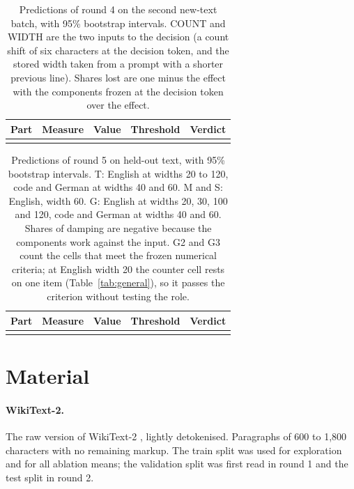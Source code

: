 \documentclass[11pt,a4paper]{article}
\begin{document}
\begin{table}[!tp]
\centering\scriptsize
\caption{Predictions of round 4 on the second new-text batch, with 95\% bootstrap intervals. COUNT and WIDTH are the two inputs to the decision (a count shift of six characters at the decision token, and the stored width taken from a prompt with a shorter previous line). Shares lost are one minus the effect with the components frozen at the decision token over the effect.}
\label{tab:round4}
\begin{tabularx}{\textwidth}{@{}l L P{2.7cm} P{2.9cm} l@{}}
\toprule
Part & Measure & Value & Threshold & Verdict \\
\midrule
{}
\bottomrule
\end{tabularx}
\end{table}

\begin{table}[!tp]
\centering\scriptsize
\caption{Predictions of round 5 on held-out text, with 95\% bootstrap intervals. T: English at widths 20 to 120, code and German at widths 40 and 60. M and S: English, width 60. G: English at widths 20, 30, 100 and 120, code and German at widths 40 and 60. Shares of damping are negative because the components work against the input. G2 and G3 count the cells that meet the frozen numerical criteria; at English width 20 the counter cell rests on one item (Table~\ref{tab:general}), so it passes the criterion without testing the role.}
\label{tab:round5}
\begin{tabularx}{\textwidth}{@{}l L P{3.6cm} P{3.0cm} l@{}}
\toprule
Part & Measure & Value & Threshold & Verdict \\
\midrule
{}
\bottomrule
\end{tabularx}
\end{table}

\FloatBarrier
\section{Material}
\label{app:material}

\paragraph{WikiText-2.}
The raw version of WikiText-2 \citep{merity2017pointer}, lightly detokenised. Paragraphs of 600 to 1,800 characters with no remaining markup. The train split was used for exploration and for all ablation means; the validation split was first read in round 1 and the test split in round 2.
\end{document}
